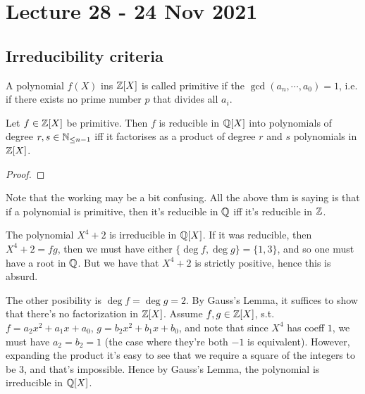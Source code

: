 \section{Lecture 28 - 24 Nov 2021}
\subsection{Irreducibility criteria}
\begin{definition}
  A polynomial $f(X)$ ins $\mathbb Z[X]$ is called primitive if the $\gcd(a_n,\cdots,a_0)=1$,
  i.e. if there exists no prime number $p$ that divides all $a_i$.
  \label{def:primitivePol}
\end{definition}

\begin{theorem}
  Let $f\in \mathbb Z[X]$ be primitive. Then $f$ is reducible in $\mathbb Q[X]$ into polynomials of
  degree $r,s\in \mathbb N_{\leq n-1}$ iff it factorises as a product of degree $r$ and $s$
  polynomials in $\mathbb Z[X]$.
  \label{thm:GaussLemmaPol}
\end{theorem}
\begin{proof}
\end{proof}
\begin{remark}
  Note that the working may be a bit confusing. All the above thm is saying is that if a
  polynomial is primitive, then it's reducible in $\mathbb Q$ iff it's reducible in $\mathbb Z$. 
\end{remark}
\begin{example}
  The polynomial $X^4+2$ is irreducible in $\mathbb Q[X]$. If it was reducible, then $X^4+2=fg$,
  then we must have either $\{\deg f, \deg g\}=\{1,3\}$, and so one must have a root in
  $\mathbb Q$. But we have that $X^4+2$ is strictly positive, hence this is absurd. 

  The other posibility is $\deg f=\deg g=2$. By Gauss's Lemma, it suffices to show that
  there's no factorization in $\mathbb Z[X]$. Assume $f,g\in\mathbb Z[X]$, s.t. $f=a_2x^2+a_1x+a_0$,
  $g=b_2x^2+b_1x+b_0$, and note that since $X^4$ has coeff $1$, we must have $a_2=b_2=1$
  (the case where they're both $-1$ is equivalent). However, expanding the product it's
  easy to see that we require a square of the integers to be $3$, and that's impossible.
  Hence by Gauss's Lemma, the polynomial is irreducible in $\mathbb Q[X]$.
\end{example}


